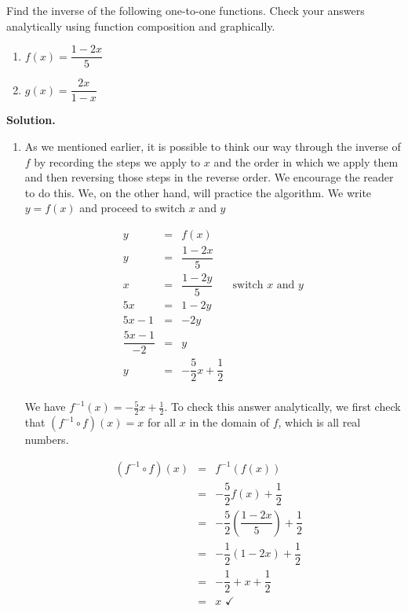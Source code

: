\begin{ex}  Find the inverse of the following one-to-one functions. Check your answers analytically using function composition and graphically.

\begin{multicols}{2}

\begin{enumerate}

\item  $f(x) =  \dfrac{1-2x}{5}$

\item  $g(x) = \dfrac{2x}{1-x}$

\end{enumerate}

\end{multicols}

{\bf Solution.}

\begin{enumerate}

\item  As we mentioned earlier, it is possible to think our way through the inverse of $f$ by recording the steps we apply to $x$ and the order in which we apply them and then reversing those steps in the reverse order.  We encourage the reader to do this.  We, on the other hand, will practice the algorithm.  We write $y=f(x)$ and proceed to switch $x$ and $y$

\[ \begin{array}{rclr}

y & = & f(x) & \\ [3pt]
y & = &  \dfrac{1-2x}{5} & \\ [6pt]
x & = & \dfrac{1-2y}{5} & \mbox{switch $x$ and $y$} \\ [6pt]
5x & = & 1 - 2y & \\
5x-1 & = & -2y & \\ 
\dfrac{5x-1}{-2} & = & y & \\ 
y & = & -\dfrac{5}{2} x + \dfrac{1}{2} & \\
\end{array} \]

We have $f^{-1}(x) = -\frac{5}{2} x + \frac{1}{2}$.  To check this answer analytically, we first check that $\left(f^{-1} \circ f \right)(x) = x $ for all $x$ in the domain of $f$, which is all real numbers.

\[ \begin{array}{rclr}
\left(f^{-1} \circ f \right)(x) & = & f^{-1}(f(x)) & \\ 
& = & -\dfrac{5}{2} f(x) + \dfrac{1}{2} & \\ [6pt]
& = & -\dfrac{5}{2} \left(\dfrac{1-2x}{5}\right) + \dfrac{1}{2} & \\ 
& = & -\dfrac{1}{2} (1-2x) + \dfrac{1}{2} & \\ [6pt]
& = & -\dfrac{1}{2} + x + \dfrac{1}{2} & \\ 
& = & x \, \, \checkmark \\


\end{array}\]
\end{enumerate}
\end{ex}
